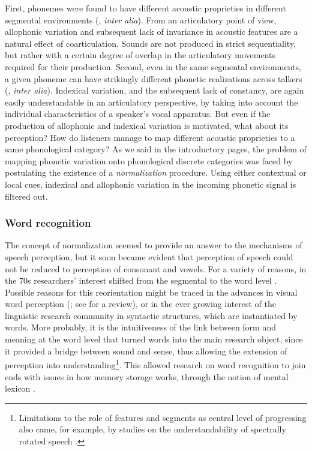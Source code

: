 First, phonemes were found to have different acoustic proprieties in different segmental environments (\citealt{delattre1955acoustic}, \textit{inter alia}). From an articulatory point of view, allophonic variation and subsequent lack of invariance in acoustic features are a natural effect of coarticulation. Sounds are not produced in strict sequentiality, but rather with a certain degree of overlap in the articulatory movements required for their production. Second, even in the same segmental environments, a given phoneme can have strikingly different phonetic realizations across talkers (\citealt{peterson1952control}, \textit{inter alia}). Indexical variation, and the subsequent lack of constancy, are again easily understandable in an articulatory perspective, by taking into account the individual characteristics of a speaker's vocal apparatus. But even if the production of allophonic and indexical variation is motivated, what about its perception? How do listeners manage to map different acoustic proprieties to a same phonological category? As we said in the introductory pages, the problem of mapping phonetic variation onto phonological discrete categories was faced by postulating the existence of a \textit{normalization} procedure. Using either contextual \citep{ladefoged1957information} or local \citep{stevens1960model} cues, indexical and allophonic variation in the incoming phonetic signal is filtered out. 

\subsubsection{Word recognition}\label{sec1112}
The concept of normalization seemed to provide an answer to the mechanisms of speech perception, but it soon became evident that perception of speech could not be reduced to perception of consonant and vowels. For a variety of reasons, in the 70s researchers' interest shifted from the segmental to the word level \citep{marslen1978processing}. Possible reasons for this reorientation might be traced in the advances in visual word perception (\citealt{wheeler1970processes}; see \citealt{balota1994visual} for a review), or in the ever growing interest of the linguistic research community in syntactic structures, which are instantiated by words. More probably, it is the intuitiveness of the link between form and meaning at the word level that turned words into the main research object, since it provided a bridge between sound and sense, thus allowing the extension of perception into understanding\footnote{Limitations to the role of features and segments as central level of progressing also came, for example, by studies on the understandability of spectrally rotated speech \citep{blesser1972speech}.}. This allowed research on word recognition to join ends with issues in how memory storage works, through the notion of mental lexicon \citep{oldfield1966things}.

